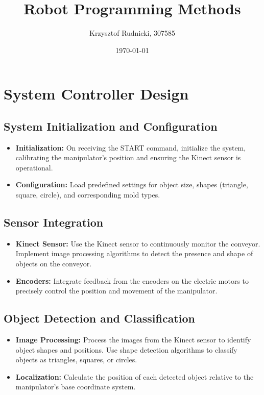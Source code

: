 \documentclass[12pt]{report}
\title{Robot Programming Methods}
\author{Krzysztof Rudnicki, 307585}
\date{\today}
\begin{document}
\maketitle
\chapter{System Controller Design}
\section{System Initialization and Configuration}
\begin{itemize}
    \item \textbf{Initialization:} On receiving the START command, initialize the system, calibrating the manipulator's position and ensuring the Kinect sensor is operational.
    \item \textbf{Configuration:} Load predefined settings for object size, shapes (triangle, square, circle), and corresponding mold types.
\end{itemize}

\section{Sensor Integration}
\begin{itemize}
    \item \textbf{Kinect Sensor:} Use the Kinect sensor to continuously monitor the conveyor. Implement image processing algorithms to detect the presence and shape of objects on the conveyor.
    \item \textbf{Encoders:} Integrate feedback from the encoders on the electric motors to precisely control the position and movement of the manipulator.
\end{itemize}

\section{Object Detection and Classification}
\begin{itemize}
    \item \textbf{Image Processing:} Process the images from the Kinect sensor to identify object shapes and positions. Use shape detection algorithms to classify objects as triangles, squares, or circles.
    \item \textbf{Localization:} Calculate the position of each detected object relative to the manipulator’s base coordinate system.
\end{itemize}
\end{document}
